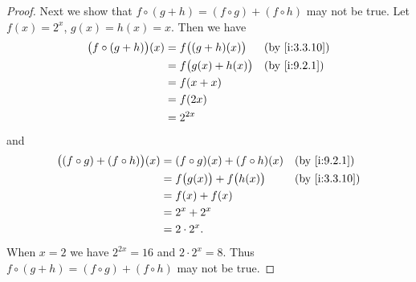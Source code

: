 \begin{proof}
  Next we show that \(f \circ (g + h) = (f \circ g) + (f \circ h)\) may not be true.
  Let \(f(x) = 2^x\), \(g(x) = h(x) = x\).
  Then we have
  \begin{align*}
    \big(f \circ (g + h)\big)(x) & = f\big((g + h)(x)\big)  &  & \by{i:3.3.10} \\
                                 & = f\big(g(x) + h(x)\big) &  & \by{i:9.2.1}  \\
                                 & = f(x + x)                                  \\
                                 & = f(2x)                                     \\
                                 & = 2^{2x}
  \end{align*}
  and
  \begin{align*}
    \big((f \circ g) + (f \circ h)\big)(x) & = (f \circ g)(x) + (f \circ h)(x)   &  & \by{i:9.2.1}  \\
                                           & = f\big(g(x)\big) + f\big(h(x)\big) &  & \by{i:3.3.10} \\
                                           & = f(x) + f(x)                                          \\
                                           & = 2^x + 2^x                                            \\
                                           & = 2 \cdot 2^x.
  \end{align*}
  When \(x = 2\) we have \(2^{2x} = 16\) and \(2 \cdot 2^x = 8\).
  Thus \(f \circ (g + h) = (f \circ g) + (f \circ h)\) may not be true.


\end{proof}
